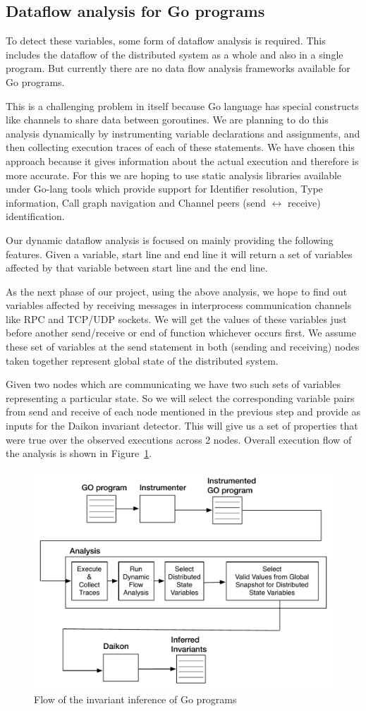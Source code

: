 \subsection{Dataflow analysis for Go programs}

To detect these variables, some form of dataflow analysis is required.
This includes the dataflow of the distributed system as a whole and
also in a single program. But currently there are no data flow
analysis frameworks available for Go programs.

This is a challenging problem in itself because Go language has
special constructs like channels to share data between goroutines. We
are planning to do this analysis dynamically by instrumenting variable
declarations and assignments, and then collecting execution traces of
each of these statements. We have chosen this approach because it
gives information about the actual execution and therefore is more
accurate. For this we are hoping to use static analysis libraries
available under Go-lang tools\cite{static_golang} which provide
support for Identifier resolution, Type information, Call graph
navigation and Channel peers (send $\leftrightarrow$ receive)
identification.

Our dynamic dataflow analysis is focused on mainly providing the
following features. Given a variable, start line and end line it will
return a set of variables affected by that variable between start line
and the end line.

As the next phase of our project, using the above analysis, we hope to
find out variables affected by receiving messages in interprocess
communication channels like RPC and TCP/UDP sockets. We will get the
values of these variables just before another send/receive or end of
function whichever occurs first. We assume these set of variables at
the send statement in both (sending and receiving) nodes taken
together represent global state of the distributed system.

Given two nodes which are communicating we have two such sets of
variables representing a particular state. So we will select the
corresponding variable pairs from send and receive of each node
mentioned in the previous step and provide as inputs for the Daikon
invariant detector. This will give us a set of properties that were
true over the observed executions across 2 nodes. Overall execution
flow of the analysis is shown in Figure~\ref{fig:go_flow}.


\begin{figure}
  \includegraphics[width=\columnwidth]{go_flow.pdf}
  \caption{Flow of the invariant inference of Go programs}
  \label{fig:go_flow}
\end{figure}